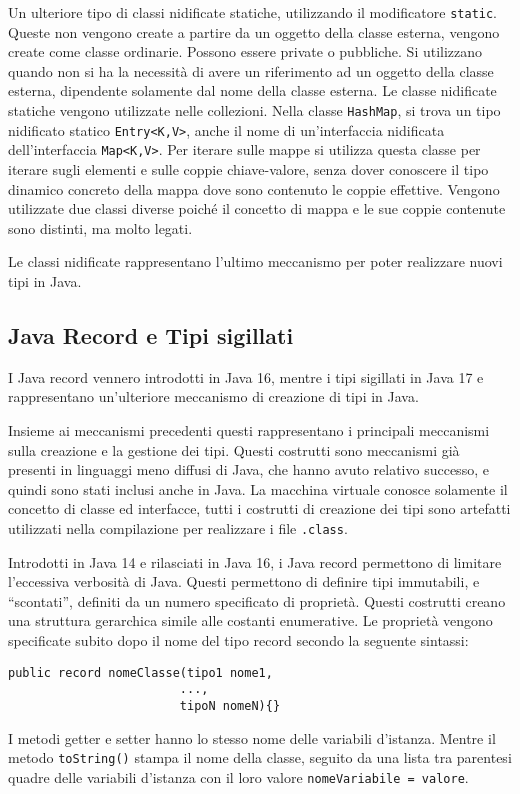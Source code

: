 \documentclass{article}
\numberwithin{equation}{subsection}
\begin{document}
Un ulteriore tipo di classi nidificate statiche, utilizzando il modificatore \verb|static|. Queste non vengono create a partire da un oggetto della classe esterna, vengono 
create come classe ordinarie. Possono essere private o pubbliche. 
Si utilizzano quando non si ha la necessità di avere un riferimento ad un oggetto della classe esterna, dipendente solamente dal nome della classe esterna. 
Le classe nidificate statiche vengono utilizzate nelle collezioni. Nella classe \verb|HashMap|, si 
trova un tipo nidificato statico \verb|Entry<K,V>|, anche il nome di un'interfaccia nidificata dell'interfaccia \verb|Map<K,V>|. Per iterare sulle mappe si utilizza questa 
classe per iterare sugli elementi e sulle coppie chiave-valore, senza dover conoscere il tipo dinamico concreto della mappa dove sono contenuto le coppie 
effettive. 
Vengono utilizzate due classi diverse poiché il concetto di mappa e le sue coppie contenute sono distinti, ma molto legati. 

Le classi nidificate rappresentano l'ultimo meccanismo per poter realizzare nuovi tipi in Java. 

\subsection{Java Record e Tipi sigillati}

I Java record vennero introdotti in Java 16, mentre i tipi sigillati in Java 17 e rappresentano un'ulteriore meccanismo di creazione di tipi in Java. 

Insieme ai meccanismi precedenti questi rappresentano i principali meccanismi sulla creazione e la gestione dei tipi. Questi costrutti sono meccanismi già presenti in 
linguaggi meno diffusi di Java, che hanno avuto relativo successo, e quindi sono stati inclusi anche in Java. 
La macchina virtuale conosce solamente il concetto di classe ed interfacce, tutti i costrutti di creazione dei tipi sono artefatti utilizzati nella compilazione per realizzare i file \verb|.class|. 

Introdotti in Java 14 e rilasciati in Java 16, i Java record permettono di limitare l'eccessiva verbosità di Java. Questi permettono di definire tipi immutabili, e 
``scontati'', definiti da un numero specificato di proprietà. 
Questi costrutti creano una struttura gerarchica simile alle costanti enumerative. Le proprietà vengono specificate subito dopo il nome del tipo record secondo la seguente sintassi:
\begin{verbatim}
public record nomeClasse(tipo1 nome1, 
                        ..., 
                        tipoN nomeN){}
\end{verbatim}
I metodi getter e setter hanno lo stesso nome delle variabili d'istanza. Mentre il metodo \verb|toString()| stampa il nome della classe, seguito da una lista tra parentesi 
quadre delle variabili d'istanza con il loro valore \verb|nomeVariabile = valore|. 
\end{document}
